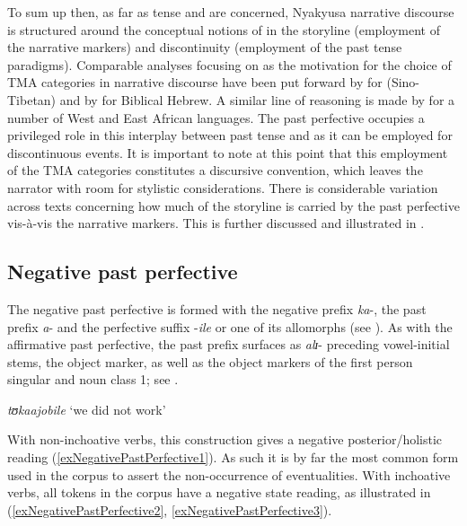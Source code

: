 To sum up then, as far as tense and  are concerned, Nyakyusa narrative discourse is structured around the conceptual notions of  in the storyline (employment of the narrative markers) and discontinuity (employment of the past tense paradigms). Comparable analyses focusing on  as the motivation for the choice of TMA categories in narrative discourse have been put forward by \citet{WattersD2002} for  (Sino-Tibetan) and by \citet{RobarE2014} for Biblical Hebrew. A similar line of reasoning is made by \citet{CarlsonR1992} for a number of West and East African languages. The past perfective occupies a privileged role in this interplay between past tense and  as it can be employed for discontinuous events. It is important to note at this point that this employment of the TMA categories constitutes a discursive convention, which leaves the narrator with room for stylistic considerations. There is considerable variation across texts concerning how much of the storyline is carried by the past perfective vis-à-vis the narrative markers. This is further discussed and illustrated in .
\subsection{Negative past perfective}
\label{NEGPstPFV}
The negative past perfective is formed with the negative prefix \textit{ka}-, the past prefix \textit{a}- and the perfective suffix -\textit{ile} or one of its allomorphs (see ). As with the affirmative past perfective, the past prefix surfaces as \textit{alɪ}- preceding vowel-initial stems, the  object marker, as well as the object markers of the first person singular and noun class 1; see .

\begin{exe}
\ex \textit{tʊkaajobile} \lq we did not work'
\end{exe}

With non-inchoative verbs, this construction gives a negative posterior/ho\-lis\-tic reading (\ref{exNegativePastPerfective1}). As such it is by far the most common form used in the  corpus to assert the non-occurrence of eventualities. With inchoative verbs, all tokens in the corpus have a negative state reading, as illustrated in (\ref{exNegativePastPerfective2}, \ref{exNegativePastPerfective3}).


